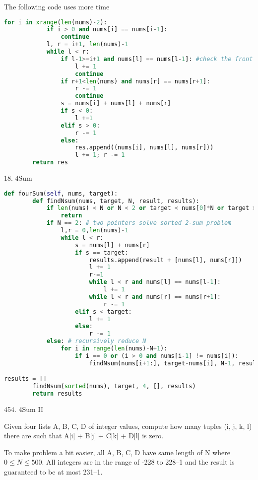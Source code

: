 \documentclass[../main.tex]{subfiles}
\begin{document}
The following code uses more time
\begin{lstlisting}[language = Python]
for i in xrange(len(nums)-2):
            if i > 0 and nums[i] == nums[i-1]:
                continue
            l, r = i+1, len(nums)-1
            while l < r:
                if l-1>=i+1 and nums[l] == nums[l-1]: #check the front
                    l += 1
                    continue
                if r+1<len(nums) and nums[r] == nums[r+1]:
                    r -= 1
                    continue
                s = nums[i] + nums[l] + nums[r]
                if s < 0:
                    l +=1 
                elif s > 0:
                    r -= 1
                else:
                    res.append((nums[i], nums[l], nums[r]))
                    l += 1; r -= 1
        return res
\end{lstlisting}
18. 4Sum
\begin{lstlisting}[language = Python]
def fourSum(self, nums, target):
        def findNsum(nums, target, N, result, results):
            if len(nums) < N or N < 2 or target < nums[0]*N or target > nums[-1]*N:  # early termination
                return
            if N == 2: # two pointers solve sorted 2-sum problem
                l,r = 0,len(nums)-1
                while l < r:
                    s = nums[l] + nums[r]
                    if s == target:
                        results.append(result + [nums[l], nums[r]])
                        l += 1
                        r-=1
                        while l < r and nums[l] == nums[l-1]:
                            l += 1
                        while l < r and nums[r] == nums[r+1]:
                            r -= 1
                    elif s < target:
                        l += 1
                    else:
                        r -= 1
            else: # recursively reduce N
                for i in range(len(nums)-N+1):
                    if i == 0 or (i > 0 and nums[i-1] != nums[i]):
                        findNsum(nums[i+1:], target-nums[i], N-1, result+[nums[i]], results) #reduce nums size, reduce target, save result

results = []
        findNsum(sorted(nums), target, 4, [], results)
        return results
\end{lstlisting}

454. 4Sum II

Given four lists A, B, C, D of integer values, compute how many tuples (i, j, k, l) there are such that A[i] + B[j] + C[k] + D[l] is zero.

To make problem a bit easier, all A, B, C, D have same length of N where $0 \leq N \leq 500$. All integers are in the range of -228 to 228–1 and the result is guaranteed to be at most 231–1.
\end{document}
